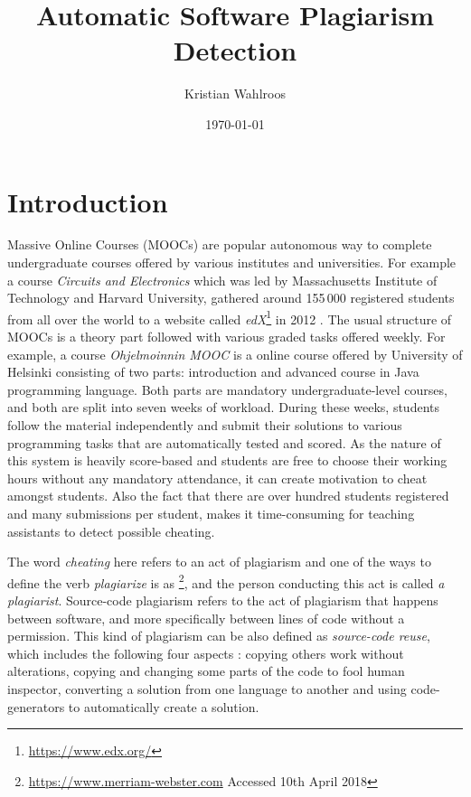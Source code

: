 \documentclass[english, grading]{tktltiki2}
\title{Automatic Software Plagiarism Detection}
\author{Kristian Wahlroos}
\date{\today}
\theoremstyle{definition}
\theoremstyle{remark}
\numberwithin{equation}{section} %
\begin{document}

\frontmatter      %

\maketitle        %
\makeabstract     %

\tableofcontents  %


\mainmatter       %

\section{Introduction}


Massive Online Courses (MOOCs) are popular autonomous way to complete undergraduate courses offered by various institutes and universities. For example a course \emph{Circuits and Electronics} which was led by Massachusetts Institute of Technology and Harvard University, gathered around 155\,000 registered students from all over the world to a website called \emph{edX}\footnote{\url{https://www.edx.org/}} in 2012 \cite{SLWCRFM2013}. The usual structure of MOOCs is a theory part followed with various graded tasks offered weekly. For example, a course \emph{Ohjelmoinnin MOOC} is a online course offered by University of Helsinki consisting of two parts: introduction and advanced course in Java programming language. Both parts are mandatory undergraduate-level courses, and both are split into seven weeks of workload. During these weeks, students follow the material independently and submit their solutions to various programming tasks that are automatically tested and scored. As the nature of this system is heavily score-based and students are free to choose their working hours without any mandatory attendance, it can create motivation to cheat amongst students. Also the fact that there are over hundred students registered and many submissions per student, makes it time-consuming for teaching assistants to detect possible cheating. 

The word \emph{cheating} here refers to an act of plagiarism and one of the ways to define the verb \emph{plagiarize} is as \footnote{\url{https://www.merriam-webster.com} Accessed 10th April 2018}, and the person conducting this act is called \emph{a plagiarist}. Source-code plagiarism refers to the act of plagiarism that happens between software, and more specifically between lines of code without a permission. This kind of plagiarism can be also defined as \emph{source-code reuse}, which includes the following four aspects \cite{TDSCP2008}: copying others work without alterations, copying and changing some parts of the code to fool human inspector, converting a solution from one language to another and using code-generators to automatically create a solution. 
\end{document}
